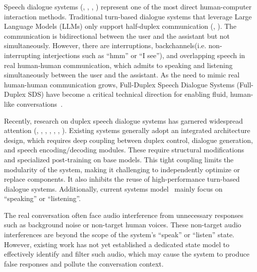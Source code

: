 \documentclass[11pt]{article}
\begin{document}
Speech dialogue systems (\citealp{das2024speechverse}, \citealp{xie2024mini}, \citealp{huang2024audiogpt}, \citealp{zhang2024speechgpt}) represent one of the most direct human-computer interaction methods. Traditional turn-based dialogue systems that leverage Large Language Models (LLMs) only support half-duplex communication (\citealp{lakhotia2021generativespokenlanguagemodeling}, \citealp{borsos2023audiolm}). The communication is bidirectional between the user and the assistant but not simultaneously.
However, there are interruptions, backchannels(i.e. non-interrupting interjections such as ``hmm'' or ``I see''), and overlapping speech in real human-human communication, which admits to speaking and listening simultaneously between the user and the assistant.
As the need to mimic real human-human communication grows, Full-Duplex Speech Dialogue Systems (Full-Duplex SDS) have become a critical technical direction for enabling fluid, human-like conversations~\cite{ji2024wavchatsurveyspokendialogue}. 

Recently, research on duplex speech dialogue systems has garnered widespread attention (\citealp{Lin_2022},  \citealp{défossez2024moshispeechtextfoundationmodel}, \citealp{wang2024fullduplexspeechdialoguescheme}, \citealp{chen2025MinMomultimodallargelanguage}, \citealp{veluri2024turnbasedinterfacessynchronousllms}, \citealp{zhang2025omniflattenendtoendgptmodel}, \citealp{mai2025realtimetextlessdialoguegeneration}). 
Existing systems generally adopt an integrated architecture design, which requires deep coupling between duplex control, dialogue generation, and speech encoding/decoding modules. These require structural modifications and specialized post-training on base models.  This tight coupling limits the modularity of the system, making it challenging to independently optimize or replace components. It also inhibits the reuse of high-performance turn-based dialogue systems. 
Additionally, current systems model~\citep{wang2024fullduplexspeechdialoguescheme,wang2024freezeomnismartlowlatency,chen2025MinMomultimodallargelanguage,défossez2024moshispeechtextfoundationmodel} mainly focus on ``speaking'' or ``listening''. 

The real conversation often face audio interference from unnecessary responses such as background noise or non-target human voices. These non-target audio interferences are beyond the scope of the system's ``speak'' or ``listen'' state. However, existing work has not yet established a dedicated state model to effectively identify and filter such audio, which may cause the system to produce false responses and pollute the conversation context.
\end{document}
